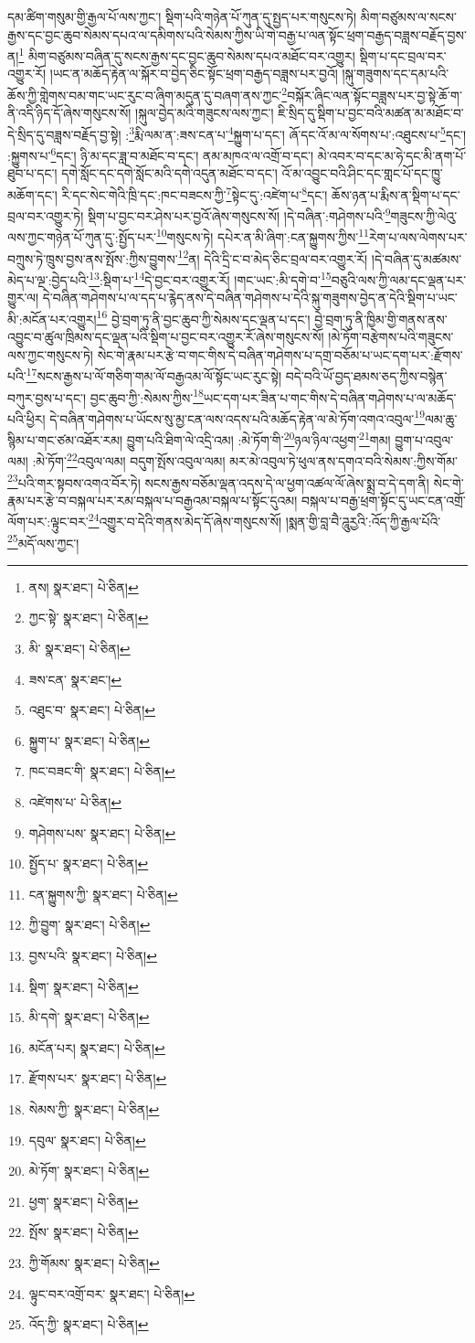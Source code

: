 དམ་ཚིག་གསུམ་གྱི་རྒྱལ་པོ་ལས་ཀྱང་། སྡིག་པའི་གཉེན་པོ་ཀུན་དུ་སྤྱད་པར་གསུངས་ཏེ། མིག་བཙུམས་ལ་སངས་རྒྱས་དང་བྱང་ཆུབ་སེམས་དཔའ་ལ་དམིགས་པའི་སེམས་ཀྱིས་ཡི་གེ་བརྒྱ་པ་ལན་སྟོང་ཕྲག་བརྒྱད་བཟླས་བརྗོད་བྱས་ན།\footnote{ནས།  སྣར་ཐང་།  པེ་ཅིན། } མིག་བཙུམས་བཞིན་དུ་སངས་རྒྱས་དང་བྱང་ཆུབ་སེམས་དཔའ་མཐོང་བར་འགྱུར། སྡིག་པ་དང་བྲལ་བར་འགྱུར་རོ། །ཡང་ན་མཆོད་རྟེན་ལ་སྐོར་བ་བྱེད་ཅིང་སྟོང་ཕྲག་བརྒྱད་བཟླས་པར་བྱའོ། །སྐུ་གཟུགས་དང་དམ་པའི་ཆོས་ཀྱི་གླེགས་བམ་གང་ཡང་རུང་བ་ཞིག་མདུན་དུ་བཞག་ནས་ཀྱང་\footnote{ཀྱང་སྟེ་  སྣར་ཐང་།  པེ་ཅིན། }བསྐོར་ཞིང་ལན་སྟོང་བཟླས་པར་བྱ་སྟེ་ཆོ་ག་ནི་འདི་ཉིད་དོ་ཞེས་གསུངས་སོ། །སྐུལ་བྱེད་མའི་གཟུངས་ལས་ཀྱང་། ཇི་སྲིད་དུ་སྡིག་པ་བྱང་བའི་མཚན་མ་མཐོང་བ་དེ་སྲིད་དུ་བཟླས་བརྗོད་བྱ་སྟེ། :\footnote{མི་  སྣར་ཐང་།  པེ་ཅིན། }རྨི་ལམ་ན་:ཟས་ངན་པ་\footnote{ཟས་ངན་  སྣར་ཐང་། }སྐྱུག་པ་དང་། ཞོ་དང་འོ་མ་ལ་སོགས་པ་:འཐུངས་པ་\footnote{འཐུང་བ་  སྣར་ཐང་།  པེ་ཅིན། }དང་། :སྐྱུགས་པ་\footnote{སྐྱུག་པ་  སྣར་ཐང་།  པེ་ཅིན། }དང་། ཉི་མ་དང་ཟླ་བ་མཐོང་བ་དང་། ནམ་མཁའ་ལ་འགྲོ་བ་དང་། མེ་འབར་བ་དང་མ་ཧེ་དང་མི་ནག་པོ་ཐུབ་པ་དང་། དགེ་སློང་དང་དགེ་སློང་མའི་དགེ་འདུན་མཐོང་བ་དང་། འོ་མ་འབྱུང་བའི་ཤིང་དང་གླང་པོ་དང་ཁྱུ་མཆོག་དང་། རི་དང་སེང་གེའི་ཁྲི་དང་:ཁང་བཟངས་ཀྱི་\footnote{ཁང་བཟང་གི་  སྣར་ཐང་།  པེ་ཅིན། }སྟེང་དུ་:འཛེག་པ་\footnote{འཛེགས་པ་  པེ་ཅིན། }དང་། ཆོས་ཉན་པ་རྨིས་ན་སྡིག་པ་དང་བྲལ་བར་འགྱུར་ཏེ། སྡིག་པ་བྱང་བར་ཤེས་པར་བྱའོ་ཞེས་གསུངས་སོ། །དེ་བཞིན་:གཤེགས་པའི་\footnote{གཤེགས་པས་  སྣར་ཐང་།  པེ་ཅིན། }གཟུངས་ཀྱི་ལེའུ་ལས་ཀྱང་གཉེན་པོ་ཀུན་དུ་:སྤྱོད་པར་\footnote{སྤྱོད་པ་  སྣར་ཐང་།  པེ་ཅིན། }གསུངས་ཏེ། དཔེར་ན་མི་ཞིག་:ངན་སྐྱུགས་ཀྱིས་\footnote{ངན་སྐྱུགས་ཀྱི་  སྣར་ཐང་།  པེ་ཅིན། }རེག་པ་ལས་ལེགས་པར་བཀྲུས་ཏེ་ཁྲུས་བྱས་ནས་སྤོས་:ཀྱིས་བྱུགས་\footnote{ཀྱི་བྱུག་  སྣར་ཐང་།  པེ་ཅིན། }ན། དེའི་དྲི་ང་བ་མེད་ཅིང་བྲལ་བར་འགྱུར་རོ། །དེ་བཞིན་དུ་མཚམས་མེད་པ་ལྔ་:བྱེད་པའི་\footnote{བྱས་པའི་  སྣར་ཐང་།  པེ་ཅིན། }:སྡིག་པ་\footnote{སྡིག་  སྣར་ཐང་།  པེ་ཅིན། }དེ་བྱང་བར་འགྱུར་རོ། །གང་ཡང་:མི་དགེ་བ་\footnote{མི་དགེ་  སྣར་ཐང་།  པེ་ཅིན། }བཅུའི་ལས་ཀྱི་ལམ་དང་ལྡན་པར་གྱུར་ལ། དེ་བཞིན་གཤེགས་པ་ལ་དད་པ་རྙེད་ནས་དེ་བཞིན་གཤེགས་པ་དེའི་སྐུ་གཟུགས་བྱེད་ན་དེའི་སྡིག་པ་ཡང་མི་:མངོན་པར་འགྱུར།\footnote{མངོན་པར།  སྣར་ཐང་།  པེ་ཅིན། } བྱེ་བྲག་ཏུ་ནི་བྱང་ཆུབ་ཀྱི་སེམས་དང་ལྡན་པ་དང་། བྱེ་བྲག་ཏུ་ནི་ཁྱིམ་གྱི་གནས་ནས་འབྱུང་བ་ཚུལ་ཁྲིམས་དང་ལྡན་པའི་སྡིག་པ་བྱང་བར་འགྱུར་རོ་ཞེས་གསུངས་སོ། །མེ་ཏོག་བརྩེགས་པའི་གཟུངས་ལས་ཀྱང་གསུངས་ཏེ། སེང་གེ་རྣམ་པར་རྩེ་བ་གང་གིས་དེ་བཞིན་གཤེགས་པ་དགྲ་བཅོམ་པ་ཡང་དག་པར་:རྫོགས་པའི་\footnote{རྫོགས་པར་  སྣར་ཐང་།  པེ་ཅིན། }སངས་རྒྱས་པ་ལོ་གཅིག་གམ་ལོ་བརྒྱའམ་ལོ་སྟོང་ཡང་རུང་སྟེ། བདེ་བའི་ཡོ་བྱད་ཐམས་ཅད་ཀྱིས་བསྙེན་བཀུར་བྱས་པ་དང་། བྱང་ཆུབ་ཀྱི་:སེམས་ཀྱིས་\footnote{སེམས་ཀྱི་  སྣར་ཐང་།  པེ་ཅིན། }ཡང་དག་པར་ཟིན་པ་གང་གིས་དེ་བཞིན་གཤེགས་པ་ལ་མཆོད་པའི་ཕྱིར། དེ་བཞིན་གཤེགས་པ་ཡོངས་སུ་མྱ་ངན་ལས་འདས་པའི་མཆོད་རྟེན་ལ་མེ་ཏོག་འགའ་འབུལ་\footnote{དབུལ་  སྣར་ཐང་།  པེ་ཅིན། }ལམ་ཆུ་སྙིམ་པ་གང་ཙམ་འཐོར་རམ། བྱུག་པའི་ཐིག་ལེ་འདྲི་འམ། :མེ་ཏོག་གི་\footnote{མེ་ཏོག་  སྣར་ཐང་།  པེ་ཅིན། }ཉལ་ཉིལ་འཕྱག་\footnote{ཕྱག་  སྣར་ཐང་།  པེ་ཅིན། }གམ། བྱུག་པ་འབུལ་ལམ། :མེ་ཏོག་\footnote{སྤོས་  སྣར་ཐང་།  པེ་ཅིན། }འབུལ་ལམ། བདུག་སྤོས་འབུལ་ལམ། མར་མེ་འབུལ་ཏེ་ཕུལ་ནས་དགའ་བའི་སེམས་:ཀྱིས་གོམ་\footnote{ཀྱི་གོམས་  སྣར་ཐང་།  པེ་ཅིན། }པའི་གར་སྟབས་འགའ་བོར་ཏེ། སངས་རྒྱས་བཅོམ་ལྡན་འདས་དེ་ལ་ཕྱག་འཚལ་ལོ་ཞེས་སྨྲ་བ་དེ་དག་ནི། སེང་གེ་རྣམ་པར་རྩེ་བ་བསྐལ་པར་རམ་བསྐལ་པ་བརྒྱའམ་བསྐལ་པ་སྟོང་དུའམ། བསྐལ་པ་བརྒྱ་ཕྲག་སྟོང་དུ་ཡང་ངན་འགྲོ་ལོག་པར་:ལྟུང་བར་\footnote{ལྟུང་བར་འགྲོ་བར་  སྣར་ཐང་།  པེ་ཅིན། }འགྱུར་བ་དེའི་གནས་མེད་དོ་ཞེས་གསུངས་སོ། །སྨན་གྱི་བླ་བཻ་ཌཱུརྱའི་:འོད་ཀྱི་རྒྱལ་པོའི་\footnote{འོད་ཀྱི་  སྣར་ཐང་།  པེ་ཅིན། }མདོ་ལས་ཀྱང་། 